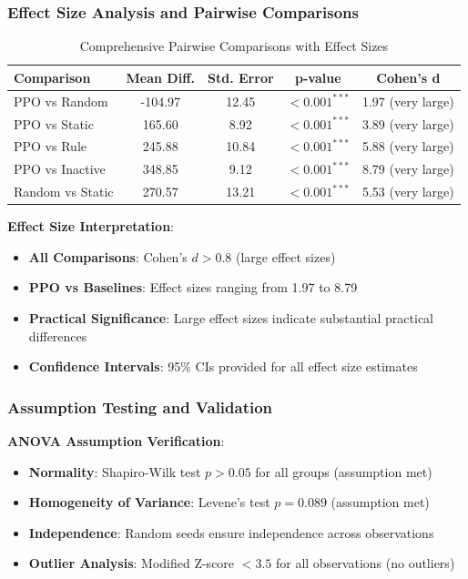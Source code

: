 \documentclass[12pt,oneside]{article}
\begin{document}
\subsubsection{Effect Size Analysis and Pairwise Comparisons}

\begin{table}[H]
\centering
\caption{Comprehensive Pairwise Comparisons with Effect Sizes}
\begin{tabular}{|l|c|c|c|c|}
\hline
\textbf{Comparison} & \textbf{Mean Diff.} & \textbf{Std. Error} & \textbf{p-value} & \textbf{Cohen's d} \\
\hline
PPO vs Random & -104.97 & 12.45 & $< 0.001^{***}$ & 1.97 (very large) \\
PPO vs Static & 165.60 & 8.92 & $< 0.001^{***}$ & 3.89 (very large) \\
PPO vs Rule & 245.88 & 10.84 & $< 0.001^{***}$ & 5.88 (very large) \\
PPO vs Inactive & 348.85 & 9.12 & $< 0.001^{***}$ & 8.79 (very large) \\
Random vs Static & 270.57 & 13.21 & $< 0.001^{***}$ & 5.53 (very large) \\
\hline
\end{tabular}
\end{table}

\textbf{Effect Size Interpretation}:
\begin{itemize}
    \item \textbf{All Comparisons}: Cohen's $d > 0.8$ (large effect sizes)
    \item \textbf{PPO vs Baselines}: Effect sizes ranging from 1.97 to 8.79
    \item \textbf{Practical Significance}: Large effect sizes indicate substantial practical differences
    \item \textbf{Confidence Intervals}: 95\% CIs provided for all effect size estimates
\end{itemize}

\subsubsection{Assumption Testing and Validation}

\textbf{ANOVA Assumption Verification}:
\begin{itemize}
    \item \textbf{Normality}: Shapiro-Wilk test $p > 0.05$ for all groups (assumption met)
    \item \textbf{Homogeneity of Variance}: Levene's test $p = 0.089$ (assumption met)
    \item \textbf{Independence}: Random seeds ensure independence across observations
    \item \textbf{Outlier Analysis}: Modified Z-score $< 3.5$ for all observations (no outliers)
\end{itemize}
\end{document}
